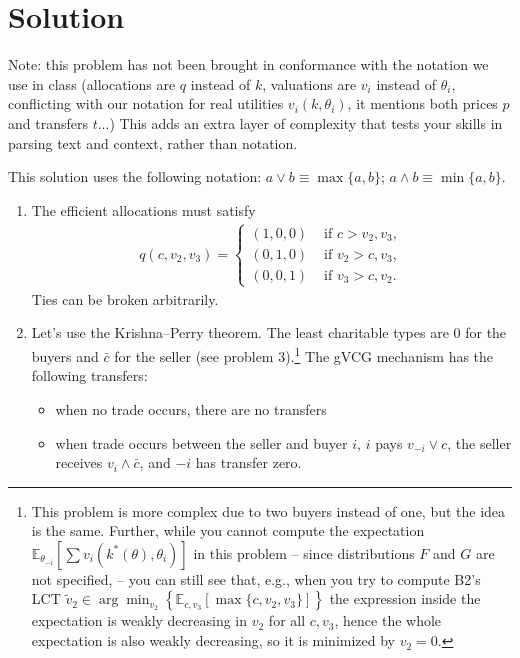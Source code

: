 \documentclass[a4paper]{article}
\newif\ifsolutions
\begin{document}
\ifsolutions
\section*{Solution}
Note: this problem has not been brought in conformance with the notation we use in class (allocations are $q$ instead of $k$, valuations are $v_i$ instead of $\theta_i$, conflicting with our notation for real utilities $v_i(k,\theta_i)$, it mentions both prices $p$ and transfers $t$...) This adds an extra layer of complexity that tests your skills in parsing text and context, rather than notation.

This solution uses the following notation: $a \vee b \equiv \max\{a,b\}$; $a \wedge b \equiv \min \{a,b\}$.
\begin{enumerate}%
	\item The efficient allocations must satisfy
	\begin{align*}
		q(c, v_2, v_3) = 
		\begin{cases}
			(1,0,0) &\text{ if } c > v_2, v_3, \\
			(0,1,0) &\text{ if } v_2 > c,v_3, \\
			(0,0,1) &\text{ if } v_3 > c,v_2.
		\end{cases}
	\end{align*}
	Ties can be broken arbitrarily.
	
	\item Let's use the Krishna--Perry theorem. The least charitable types are $0$ for the buyers and $\bar{c}$ for the seller (see problem 3).\footnote{This problem is more complex due to two buyers instead of one, but the idea is the same. Further, while you cannot compute the expectation $\mathbb{E}_{\theta_{-i}} [\sum v_i(k^*(\theta),\theta_i)]$ in this problem -- since distributions $F$ and $G$ are not specified, -- you can still see that, e.g., when you try to compute B2's LCT $\tilde{v}_2 \in \arg \min_{v_2} \left\{ \mathbb{E}_{c,v_3} \left[ \max\{c,v_2,v_3\} \right] \right\}$ the expression inside the expectation is weakly decreasing in $v_2$ for all $c,v_3$, hence the whole expectation is also weakly decreasing, so it is minimized by $v_2 = 0$.} 
	The gVCG mechanism has the following transfers:
	\begin{itemize}
		
		\item when no trade occurs, there are no transfers
		
		\item when trade occurs between the seller and buyer $i$, $i$ pays $v_{-i} \vee c$, the seller receives $v_i \wedge \bar{c}$, and $-i$ has transfer zero.
		

\end{itemize}
\end{enumerate}
\end{document}
